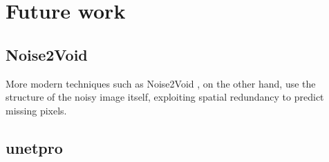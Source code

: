 







\section{Future work}

\subsection{Noise2Void}

More modern techniques such as Noise2Void \cite{krull_noise2void_2019}, on the other hand, use the structure of the noisy image itself, exploiting spatial redundancy to predict missing pixels.

\subsection{unetpro}



